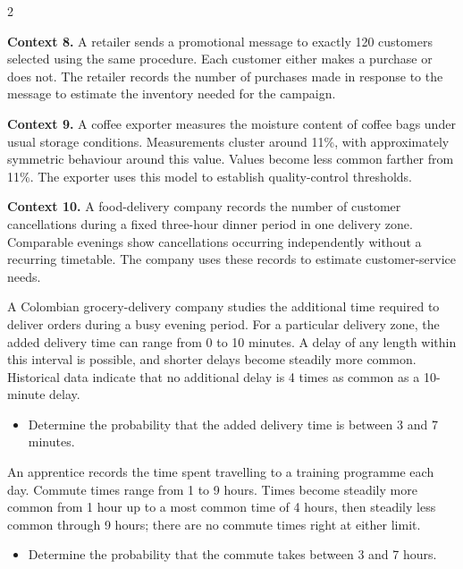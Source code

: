 \begin{multicols}{2}
{		\textbf{Context 8.} A retailer sends a promotional message to exactly
		120 customers selected using the same procedure. Each customer either
		makes a purchase or does not. The retailer records the number of
		purchases made in response to the message to estimate the inventory
		needed for the campaign.
		
		\textbf{Context 9.} A coffee exporter measures the moisture content
		of coffee bags under usual storage conditions. Measurements cluster
		around 11\%, with approximately symmetric behaviour around
		this value. Values become less common farther from 11\%. The exporter
		uses this model to establish quality-control thresholds.
		
		\textbf{Context 10.} A food-delivery company records the number of
		customer cancellations during a fixed three-hour dinner period in one
		delivery zone. Comparable evenings show cancellations occurring
		independently without a recurring timetable. The company uses these
		records to estimate customer-service needs.
		}
		
		\columnbreak
		
		{
		A Colombian grocery-delivery company studies the additional time
		required to deliver orders during a busy evening period. For a particular
		delivery zone, the added delivery time can range from 0 to
		10 minutes. A delay of any length within this interval is possible, and
		shorter delays become steadily more common. Historical data indicate
		that no additional delay is 4 times as common as a 10-minute delay.
		
		\begin{itemize}
			\item[\textbf{(C2)}] Determine the probability
			that the added delivery time is between 3 and 7 minutes.
		\end{itemize}
		}
		
		{
		An apprentice records the time spent travelling to a training programme
		each day. Commute times range from 1 to 9 hours. Times become steadily
		more common from 1 hour up to a most common time of 4 hours, then
		steadily less common through 9 hours; there are no commute times right
		at either limit.
		
		\begin{itemize}
			\item[\textbf{(C2)}] Determine the probability that
			the commute takes between 3 and 7 hours.
		\end{itemize}
		}
	

\end{multicols}
